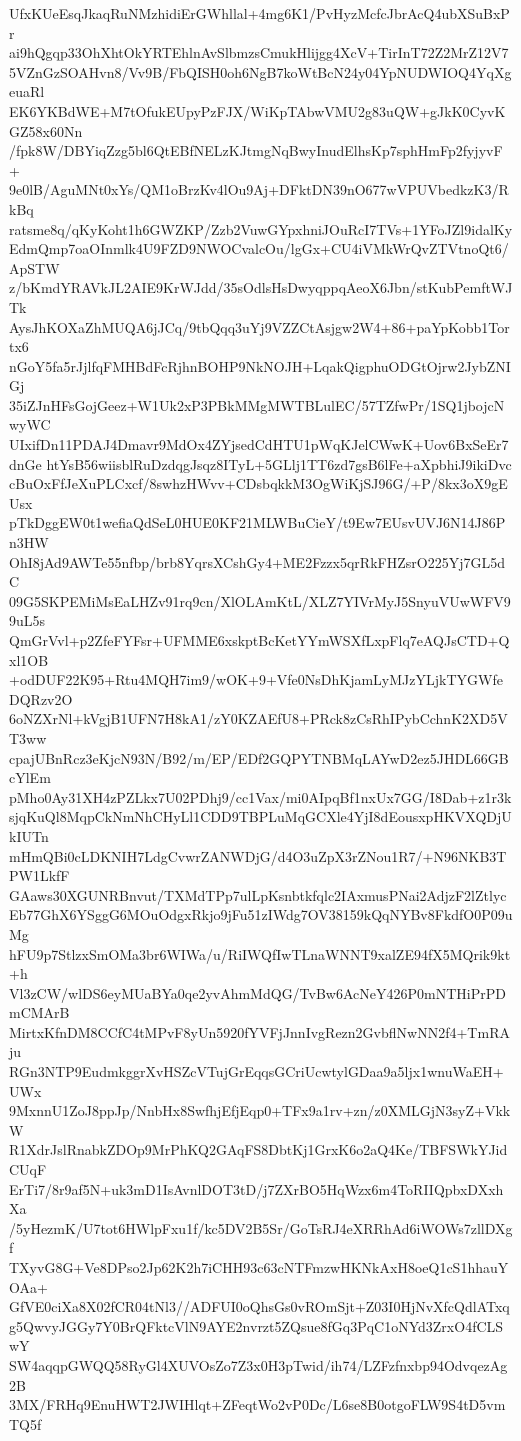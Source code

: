 UfxKUeEsqJkaqRuNMzhidiErGWhllal+4mg6K1/PvHyzMcfcJbrAcQ4ubXSuBxPr
ai9hQgqp33OhXhtOkYRTEhlnAvSlbmzsCmukHlijgg4XcV+TirInT72Z2MrZ12V7
5VZnGzSOAHvn8/Vv9B/FbQISH0oh6NgB7koWtBcN24y04YpNUDWIOQ4YqXgeuaRl
EK6YKBdWE+M7tOfukEUpyPzFJX/WiKpTAbwVMU2g83uQW+gJkK0CyvKGZ58x60Nn
/fpk8W/DBYiqZzg5bl6QtEBfNELzKJtmgNqBwyInudElhsKp7sphHmFp2fyjyvF+
9e0lB/AguMNt0xYs/QM1oBrzKv4lOu9Aj+DFktDN39nO677wVPUVbedkzK3/RkBq
ratsme8q/qKyKoht1h6GWZKP/Zzb2VuwGYpxhniJOuRcI7TVs+1YFoJZl9idalKy
EdmQmp7oaOInmlk4U9FZD9NWOCvalcOu/lgGx+CU4iVMkWrQvZTVtnoQt6/ApSTW
z/bKmdYRAVkJL2AIE9KrWJdd/35sOdlsHsDwyqppqAeoX6Jbn/stKubPemftWJTk
AysJhKOXaZhMUQA6jJCq/9tbQqq3uYj9VZZCtAsjgw2W4+86+paYpKobb1Tortx6
nGoY5fa5rJjlfqFMHBdFcRjhnBOHP9NkNOJH+LqakQigphuODGtOjrw2JybZNIGj
35iZJnHFsGojGeez+W1Uk2xP3PBkMMgMWTBLulEC/57TZfwPr/1SQ1jbojcNwyWC
UIxifDn11PDAJ4Dmavr9MdOx4ZYjsedCdHTU1pWqKJelCWwK+Uov6BxSeEr7dnGe
htYsB56wiisblRuDzdqgJsqz8ITyL+5GLlj1TT6zd7gsB6lFe+aXpbhiJ9ikiDvc
cBuOxFfJeXuPLCxcf/8swhzHWvv+CDsbqkkM3OgWiKjSJ96G/+P/8kx3oX9gEUsx
pTkDggEW0t1wefiaQdSeL0HUE0KF21MLWBuCieY/t9Ew7EUsvUVJ6N14J86Pn3HW
OhI8jAd9AWTe55nfbp/brb8YqrsXCshGy4+ME2Fzzx5qrRkFHZsrO225Yj7GL5dC
09G5SKPEMiMsEaLHZv91rq9cn/XlOLAmKtL/XLZ7YIVrMyJ5SnyuVUwWFV99uL5s
QmGrVvl+p2ZfeFYFsr+UFMME6xskptBcKetYYmWSXfLxpFlq7eAQJsCTD+Qxl1OB
+odDUF22K95+Rtu4MQH7im9/wOK+9+Vfe0NsDhKjamLyMJzYLjkTYGWfeDQRzv2O
6oNZXrNl+kVgjB1UFN7H8kA1/zY0KZAEfU8+PRck8zCsRhIPybCchnK2XD5VT3ww
cpajUBnRcz3eKjcN93N/B92/m/EP/EDf2GQPYTNBMqLAYwD2ez5JHDL66GBcYlEm
pMho0Ay31XH4zPZLkx7U02PDhj9/cc1Vax/mi0AIpqBf1nxUx7GG/I8Dab+z1r3k
sjqKuQl8MqpCkNmNhCHyLl1CDD9TBPLuMqGCXle4YjI8dEousxpHKVXQDjUkIUTn
mHmQBi0cLDKNIH7LdgCvwrZANWDjG/d4O3uZpX3rZNou1R7/+N96NKB3TPW1LkfF
GAaws30XGUNRBnvut/TXMdTPp7ulLpKsnbtkfqlc2IAxmusPNai2AdjzF2lZtlyc
Eb77GhX6YSggG6MOuOdgxRkjo9jFu51zIWdg7OV38159kQqNYBv8FkdfO0P09uMg
hFU9p7StlzxSmOMa3br6WIWa/u/RiIWQfIwTLnaWNNT9xalZE94fX5MQrik9kt+h
Vl3zCW/wlDS6eyMUaBYa0qe2yvAhmMdQG/TvBw6AcNeY426P0mNTHiPrPDmCMArB
MirtxKfnDM8CCfC4tMPvF8yUn5920fYVFjJnnIvgRezn2GvbflNwNN2f4+TmRAju
RGn3NTP9EudmkggrXvHSZcVTujGrEqqsGCriUcwtylGDaa9a5ljx1wnuWaEH+UWx
9MxnnU1ZoJ8ppJp/NnbHx8SwfhjEfjEqp0+TFx9a1rv+zn/z0XMLGjN3syZ+VkkW
R1XdrJslRnabkZDOp9MrPhKQ2GAqFS8DbtKj1GrxK6o2aQ4Ke/TBFSWkYJidCUqF
ErTi7/8r9af5N+uk3mD1IsAvnlDOT3tD/j7ZXrBO5HqWzx6m4ToRIIQpbxDXxhXa
/5yHezmK/U7tot6HWlpFxu1f/kc5DV2B5Sr/GoTsRJ4eXRRhAd6iWOWs7zllDXgf
TXyvG8G+Ve8DPso2Jp62K2h7iCHH93c63cNTFmzwHKNkAxH8oeQ1cS1hhauYOAa+
GfVE0ciXa8X02fCR04tNl3//ADFUI0oQhsGs0vROmSjt+Z03I0HjNvXfcQdlATxq
g5QwvyJGGy7Y0BrQFktcVlN9AYE2nvrzt5ZQsue8fGq3PqC1oNYd3ZrxO4fCLSwY
SW4aqqpGWQQ58RyGl4XUVOsZo7Z3x0H3pTwid/ih74/LZFzfnxbp94OdvqezAg2B
3MX/FRHq9EnuHWT2JWIHlqt+ZFeqtWo2vP0Dc/L6se8B0otgoFLW9S4tD5vmTQ5f
